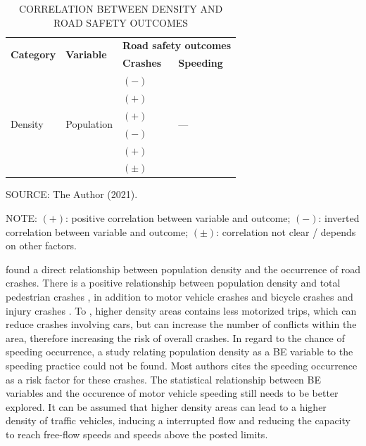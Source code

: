 \begin{table}[!hbtp]
    \footnotesize
    \captionsetup{justification=raggedright,
        singlelinecheck=false,
        font=footnotesize}
    \caption{CORRELATION BETWEEN DENSITY AND ROAD SAFETY OUTCOMES}
    \centering
    \begin{tabular}{llll}
        \hline
        \multirow{2}{*}{\textbf{Category}} & \multirow{2}{*}{\textbf{Variable}} & \multicolumn{2}{c}{\textbf{Road safety outcomes}} \\
         &  & \multicolumn{1}{l}{\textbf{Crashes}} & \multicolumn{1}{l}{\textbf{Speeding}} \\ \hline
        \multirow{6}{*}{Density} & \multirow{6}{*}{Population} & $(-)$ \textcite{Dumbaugh2009} & \multirow{6}{*}{---} \\
         &  & $(+)$ \textcite{Dumbaugh2013} &  \\
         &  & $(+)$ \textcite{Lee2015} &  \\
         &  & $(-)$ \textcite{Obelheiro2020} &  \\
         &  & $(+)$ \textcite{Pirdavani2014} &  \\
         &  & $(\pm)$ \textcite{Welle2016} &  \\ \hline
    \end{tabular}
    \label{tab:density}
    \par \vspace{2mm} \footnotesize \raggedright
    SOURCE: The Author (2021).
    \par \vspace{1mm} \footnotesize \raggedright
    NOTE: $(+)$: positive correlation between variable and outcome; $(-)$: inverted correlation between variable and outcome; $(\pm)$: correlation not clear / depends on other factors.
\end{table}

\textcite{Dumbaugh2013,Lee2015,Pirdavani2014} found a direct relationship between population density and the occurrence of road crashes. There is a positive relationship between population density and total pedestrian crashes \cite{Dumbaugh2013}, in addition to motor vehicle crashes and bicycle crashes \cite{Lee2015} and injury crashes \cite{Pirdavani2014}. To \textcite{Welle2016}, higher density areas contains less motorized trips, which can reduce crashes involving cars, but can increase the number of conflicts within the area, therefore increasing the risk of overall crashes. In regard to the chance of speeding occurrence, a study relating population density as a BE variable to the speeding practice could not be found. Most authors cites the speeding occurrence as a risk factor for these crashes. The statistical relationship between BE variables and the occurence of motor vehicle speeding still needs to be better explored. It can be assumed that higher density areas can lead to a higher density of traffic vehicles, inducing a interrupted flow and reducing the capacity to reach free-flow speeds and speeds above the posted limits.

